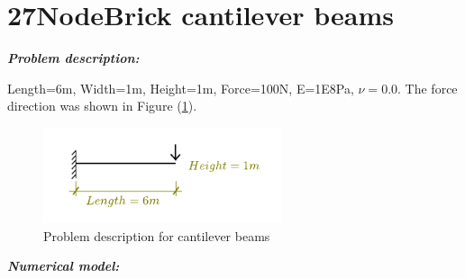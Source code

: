 \documentclass[fleqn,11pt,letter]{article}
\begin{document}

\thispagestyle{fancy}


\tableofcontents{}









\newpage

\section{27NodeBrick cantilever beams}
\vskip 24pt



\emph{\textbf{Problem description:}}

Length=6m, Width=1m, Height=1m, Force=100N, E=1E8Pa, $\nu=0.0$. The force direction was shown in Figure (\ref{fig Problem description for cantilever beams}). 

\begin{figure}[H]
  \centering
  \includegraphics[width=7cm]{../Figure_files/4NodeANDES/cantilever_6.pdf}
  \caption{Problem description for cantilever beams}
  \label{fig Problem description for cantilever beams}
\end{figure}





\noindent \emph{\textbf{Numerical model:}}
\end{document}
